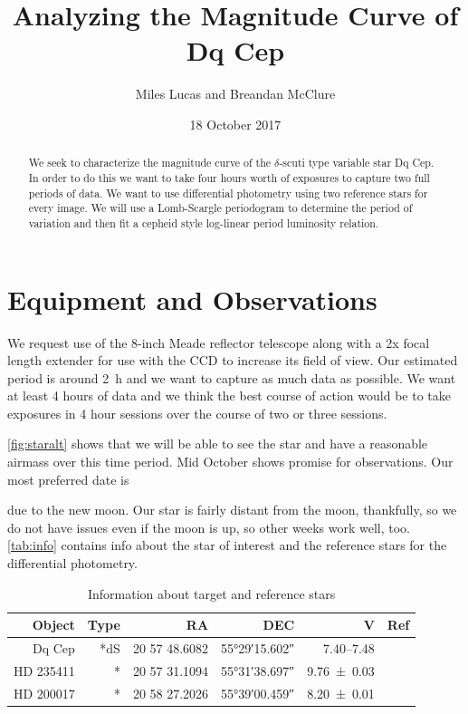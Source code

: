 \documentclass[]{article}
\title{Analyzing the Magnitude Curve of Dq Cep}
\author{Miles Lucas and Breandan McClure}
\begin{document}
\maketitle


\begin{abstract}
	We seek to characterize the magnitude curve of the $\delta$-scuti type variable star Dq Cep. In order to do this we want to take four hours worth of exposures to capture two full periods of data. We want to use differential photometry using two reference stars for every image. We will use a Lomb-Scargle periodogram to determine the period of variation and then fit a cepheid style log-linear period luminosity relation.
\end{abstract}

\section{Equipment and Observations}
	We request use of the 8-inch Meade reflector telescope along with a 2x focal length extender for use with the CCD to increase its field of view. Our estimated period is around \SI{2}{\hour} and we want to capture as much data as possible. We want at least 4 hours of data and we think the best course of action would be to take exposures in 4 hour sessions over the course of two or three sessions. 
	
	\autoref{fig:staralt} shows that we will be able to see the star and have a reasonable airmass over this time period. Mid October shows promise for observations. Our most preferred date is \date{18 October 2017} due to the new moon. Our star is fairly distant from the moon, thankfully, so we do not have issues even if the moon is up, so other weeks work well, too. \autoref{tab:info} contains info about the star of interest and the reference stars for the differential photometry.
	\begin{table}[]
		\centering
		\caption{Information about target and reference stars}
		\begin{tabular}{rrrrrr}
			\hline
			Object & Type &            RA &                DEC &                      V &                        Ref \\ \hline\hline
			Dq Cep &  *dS & 20 57 48.6082 & \ang{55;29;15.602} & \SIrange{7.40}{7.48}{} & \autocite{1971GCVS3.C......0K} \\
			HD 235411 &    * & 20 57 31.1094 & \ang{55;31;38.697} &     \SI{9.76\pm0.03}{} &  \autocite{2000AA...355L..27H} \\
			HD 200017 &    * & 20 58 27.2026 & \ang{55;39;00.459} &     \SI{8.20\pm0.01}{} &  \autocite{2000AA...355L..27H} \\ \hline
		\end{tabular}
		\label{tab:info}
	\end{table}
\end{document}
